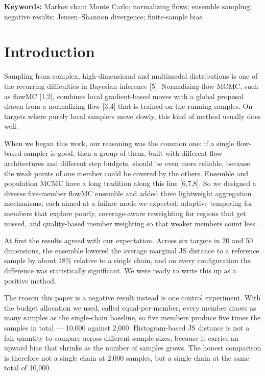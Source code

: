 \documentclass[11pt]{article}
\begin{document}
\noindent\textbf{Keywords:} Markov chain Monte Carlo; normalizing flows;
ensemble sampling; negative results; Jensen--Shannon divergence;
finite-sample bias

\section{Introduction}

Sampling from complex, high-dimensional and multimodal distributions is one
of the recurring difficulties in Bayesian inference [5]. Normalizing-flow
MCMC, such as flowMC [1,2], combines local gradient-based moves with a global
proposal drawn from a normalizing flow [3,4] that is trained on the running
samples. On targets where purely local samplers move slowly, this kind of
method usually does well.

When we began this work, our reasoning was the common one: if a single
flow-based sampler is good, then a group of them, built with different flow
architectures and different step budgets, should be even more reliable,
because the weak points of one member could be covered by the others.
Ensemble and population MCMC have a long tradition along this line [6,7,8]. So
we designed a diverse five-member flowMC ensemble and added three lightweight
aggregation mechanisms, each aimed at a failure mode we expected: adaptive
tempering for members that explore poorly, coverage-aware reweighting for
regions that get missed, and quality-based member weighting so that weaker
members count less.

At first the results agreed with our expectation. Across six targets in 20
and 50 dimensions, the ensemble lowered the average marginal JS distance to a
reference sample by about 18\% relative to a single chain, and on every
configuration the difference was statistically significant. We were ready to
write this up as a positive method.

The reason this paper is a negative result instead is one control experiment.
With the budget allocation we used, called equal-per-member, every member
draws as many samples as the single-chain baseline, so five members produce
five times the samples in total --- 10,000 against 2,000. Histogram-based JS
distance is not a fair quantity to compare across different sample sizes,
because it carries an upward bias that shrinks as the number of samples grows.
The honest comparison is therefore not a single chain at 2,000 samples, but a
single chain at the same total of 10,000.
\end{document}
